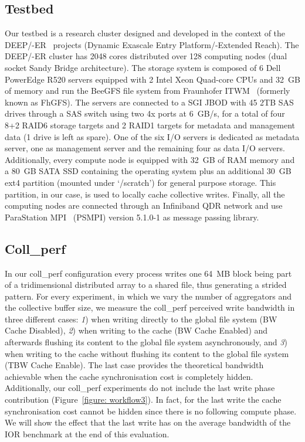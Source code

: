 \subsection{Testbed}
\label{subsec: testbed}
Our testbed is a research cluster designed and developed in the context of the DEEP/-ER~\cite{deep}\cite{deep-er} projects (Dynamic Exascale Entry Platform/-Extended Reach). The DEEP/-ER cluster has 2048 cores distributed over 128 computing nodes 
(dual socket Sandy Bridge architecture). The storage system is composed of 6 Dell PowerEdge R520 servers equipped with 2 Intel Xeon Quad-core CPUs and 32~GB of memory and run the BeeGFS file system from Fraunhofer ITWM~\cite{fhgfs} (formerly known as FhGFS). 
The servers are connected to a SGI JBOD with 45 2TB SAS drives through a SAS switch using two 4x ports at 6~GB/s, for a total of four 8+2 RAID6 storage targets and 2 RAID1 targets for metadata and management data (1 drive is left as spare). One of the six I/O 
servers is dedicated as metadata server, one as management server and the remaining four as data I/O servers.
Additionally, every compute node is equipped with 32~GB of RAM memory and a 80~GB SATA SSD containing the operating system plus an additional 30~GB ext4 partition (mounted under `/scratch') for general purpose storage. This partition, in our case, is used to 
locally cache collective writes. Finally, all the computing nodes are connected through an Infiniband QDR network and use ParaStation MPI~\cite{parastation} (PSMPI) version 5.1.0-1 as message passing library.

\subsection{Coll\_perf}
\label{subsec: coll_perf}
In our coll\_perf configuration every process writes one 64~MB block being part of a tridimensional distributed array to a shared file, thus generating a strided pattern. For every experiment, in which we vary the number of aggregators and the 
collective buffer size, we measure the coll\_perf perceived write bandwidth in three different cases: \textit{1}) when writing directly to the global file system (BW Cache Disabled), \textit{2}) when writing to the cache (BW Cache Enabled) and 
afterwards flushing its content to the global file system asynchronously, and \textit{3}) when writing to the cache without flushing its content to the global file system (TBW Cache Enable). The last case provides the theoretical bandwidth achievable 
when the cache synchronisation cost is completely hidden. Additionally, our coll\_perf experiments do not include the last write phase contribution (Figure~\ref{figure: workflow3}). In fact, for the last write the cache synchronisation cost cannot be 
hidden since there is no following compute phase. We will show the effect that the last write has on the average bandwidth of the IOR benchmark at the end of this evaluation.


